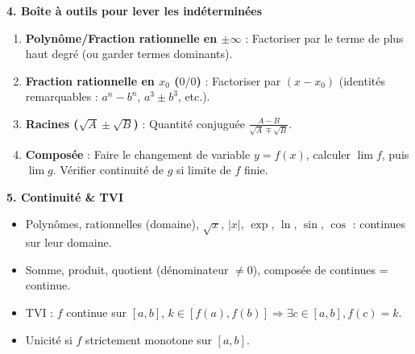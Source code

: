 \documentclass[11pt]{article}
\begin{document}
\begin{aretenir}
\textbf{4. Boîte à outils pour lever les indéterminées}
\begin{enumerate}
  \item \textbf{Polynôme/Fraction rationnelle en $\pm\infty$} : Factoriser par le terme de plus haut degré (ou garder termes dominants).
  \item \textbf{Fraction rationnelle en $x_0$ ($0/0$)} : Factoriser par $(x-x_0)$ (identités remarquables : $a^n-b^n$, $a^3\pm b^3$, etc.).
  \item \textbf{Racines ($\sqrt{A}\pm\sqrt{B}$)} : Quantité conjuguée $\frac{A-B}{\sqrt{A}\mp\sqrt{B}}$.
  \item \textbf{Composée} : Faire le changement de variable $y=f(x)$, calculer $\lim f$, puis $\lim g$. Vérifier continuité de $g$ si limite de $f$ finie.
\end{enumerate}

\textbf{5. Continuité \& TVI}
\begin{itemize}
  \item Polynômes, rationnelles (domaine), $\sqrt{x}$, $|x|$, $\exp$, $\ln$, $\sin$, $\cos$ : continues sur leur domaine.
  \item Somme, produit, quotient (dénominateur $\neq 0$), composée de continues = continue.
  \item TVI : $f$ continue sur $[a,b]$, $k\in[f(a),f(b)] \Rightarrow \exists c\in[a,b], f(c)=k$.
  \item Unicité si $f$ strictement monotone sur $[a,b]$.
\end{itemize}
\end{aretenir}
\end{document}
